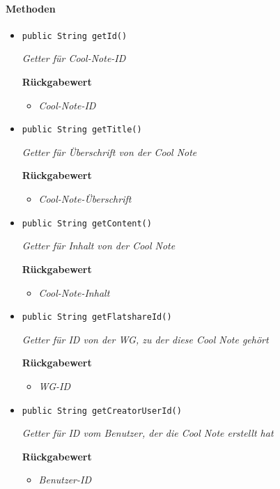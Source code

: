      \paragraph*{Methoden}
     \begin{itemize}
     	\item{\texttt{public String getId()}}
     	
     	\textit{Getter für Cool-Note-ID}
     	
     	\textbf{Rückgabewert}
     	\begin{itemize}
     		\item\textit{Cool-Note-ID}
     	\end{itemize}
     
     \item{\texttt{public String getTitle()}}
     	
     	\textit{Getter für Überschrift von der Cool Note}
     	
     	\textbf{Rückgabewert}
     	\begin{itemize}
     		\item\textit{Cool-Note-Überschrift}
     	\end{itemize}
     
     \item{\texttt{public String getContent()}}
     	
     	\textit{Getter für Inhalt von der Cool Note}
     	
     	\textbf{Rückgabewert}
     	\begin{itemize}
     		\item\textit{Cool-Note-Inhalt}
     	\end{itemize}
     
     \item{\texttt{public String getFlatshareId()}}
     	
     	\textit{Getter für ID von der WG, zu der diese Cool Note gehört}
     	
     	\textbf{Rückgabewert}
     	\begin{itemize}
     		\item\textit{WG-ID}
     	\end{itemize}
     
     \item{\texttt{public String getCreatorUserId()}}
     	
     	\textit{Getter für ID vom Benutzer, der die Cool Note erstellt hat}
     	
     	\textbf{Rückgabewert}
     	\begin{itemize}
     		\item\textit{Benutzer-ID}
     	\end{itemize}
     

\end{itemize}
